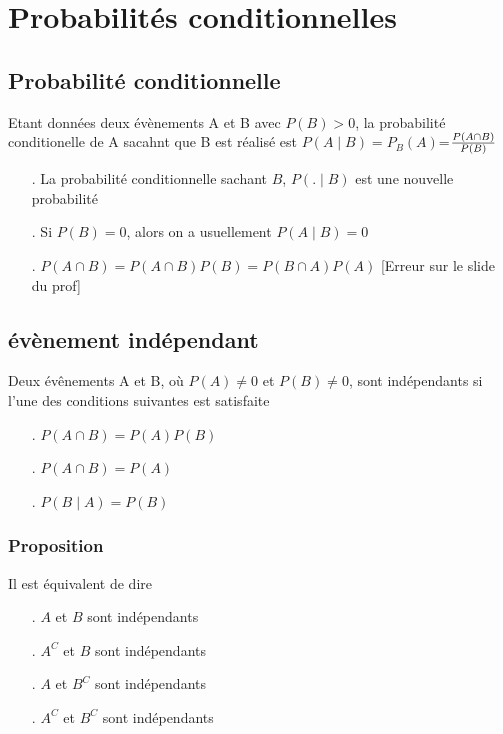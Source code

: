 \documentclass{article}
\begin{document}
    \section{Probabilités conditionnelles}
        \subsection{Probabilité conditionnelle}
            Etant données deux évènements A et B avec $P(B)>0$, la probabilité conditionelle de A sacahnt que B est réalisé est
            $P(A \mid B)=P_B(A)$=${P(A \cap B)}\over{P(B)}$ 
            \begin{itemize}
                \item[.] La probabilité conditionnelle sachant $B$, $P(.\mid B)$ est une nouvelle probabilité
                \item[.] Si $P(B)=0$, alors on a usuellement $P(A \mid B)=0$
                \item[.] $P(A \cap B)=P(A \cap B)P(B)=P(B \cap A)P(A)$ [Erreur sur le slide du prof]
            \end{itemize}
                
        \subsection{évènement indépendant}
            Deux évênements A et B, où $P(A) \neq 0$ et $P(B) \neq 0$, sont indépendants si l'une des conditions suivantes est satisfaite
            \begin{itemize}
                \item[.] $P(A\cap B)=P(A)P(B)$
                \item[.] $P(A \cap B)=P(A)$
                \item[.] $P(B \mid A)=P(B)$
            \end{itemize}
            \subsubsection{Proposition}
                Il est équivalent de dire
                \begin{itemize}
                    \item[.] $A$ et $B$ sont indépendants
                    \item[.] $A^C$ et $B$ sont indépendants
                    \item[.] $A$ et $B^C$ sont indépendants
                    \item[.] $A^C$ et $B^C$ sont indépendants
                \end{itemize}
\end{document}
